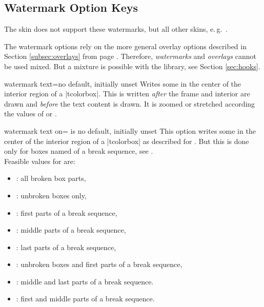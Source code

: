 \clearpage
\subsection{Watermark Option Keys}\label{subsec:watermarks}
The skin  does not support these watermarks,
but all other skins, e.\,g.\ .

\begin{marker}
The watermark options rely on the more general overlay options described in
Section \ref{subsec:overlays} from page \pageref{subsec:overlays}.
Therefore, \emph{watermarks} and \emph{overlays} cannot be used mixed.
But a mixture is possible with the  library, see Section \ref{sec:hooks}.
\end{marker}


\begin{docTcbKey}{watermark text}{=}{no default, initially unset}
  Writes some  in the center of the interior region of a |tcolorbox|.
  This  is written \emph{after} the
  frame and interior are drawn and \emph{before} the text content is drawn.
  It is zoomed or stretched according the values of
   or .
\begin{dispExample}

\begin{tcolorbox}[enhanced,title=My title,watermark text=My Watermark]
\lipsum[1]
\tcblower
\lipsum[2]
\end{tcolorbox}
\end{dispExample}
\end{docTcbKey}

\enlargethispage*{1cm}

\begin{docTcbKey}{watermark text on}{= is }{no default, initially unset}
  This option writes some  in the center of the interior region of a |tcolorbox|
  as described for .
  But this is done only for boxes named  of a break sequence, see
  .\\ 
  Feasible values for  are:
  \begin{itemize}
  \item{}: all broken box parts,
  \item{}: unbroken boxes only,
  \item{}: first parts of a break sequence,
  \item{}: middle parts of a break sequence,
  \item{}: last parts of a break sequence,
  \item{}: unbroken boxes and first parts of a break sequence,
  \item{}: middle and last parts of a break sequence.
  \item{}: first and middle parts of a break sequence.
  \end{itemize}
\end{docTcbKey}


